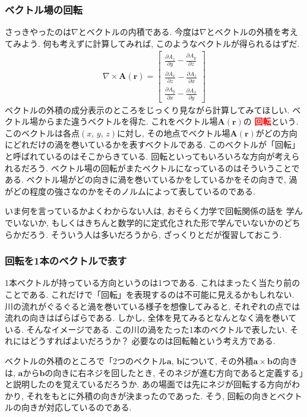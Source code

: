 \subsubsection{ベクトル場の回転}
さっきやったのは$\nabla$とベクトルの内積である. 今度は$\nabla$とベクトルの外積を考えてみよう. 
何も考えずに計算してみれば, このようなベクトルが得られるはずだ. 
\begin{eqnarray}
\nabla \times \bm{A}(\bm{r}) = \left[
\begin{array}{c}
\displaystyle
\frac{\partial A_z}{\partial y} - \frac{\partial A_y}{\partial z} \\
\displaystyle
\frac{\partial A_x}{\partial z} - \frac{\partial A_z}{\partial x} \\
\displaystyle
\frac{\partial A_y}{\partial x} - \frac{\partial A_x}{\partial y} 
\end{array}
\right]
\label{eq:rotnabla}
\end{eqnarray}
ベクトルの外積の成分表示のところをじっくり見ながら計算してみてほしい. 
ベクトル場からまた違うベクトルを得た. これをベクトル場$\bm{A}(\bm{r})$の
\textbf{\textcolor{red}{回転}}という. このベクトルは各点$(x, \, y, \, z)$に対し, 
その地点でベクトル場$\bm{A}(\bm{r})$がどの方向にどれだけの渦を巻いているかを表すベクトルである. 
このベクトルが「回転」と呼ばれているのはそこからきている. 
回転といってもいろいろな方向が考えられるだろう. 
ベクトル場の回転がまたベクトルになっているのはそういうことである. 
ベクトル場がどの向きに渦を巻いているかをしているかをその向きで, 
渦がどの程度の強さなのかをそのノルムによって表しているのである. 

いま何を言っているかよくわからない人は, おそらく力学で回転関係の話を
学んでいないか, もしくはきちんと数学的に定式化された形で学んでいないかのどちらかだろう. 
そういう人は多いだろうから, ざっくりとだが復習しておこう. 
\subsubsection{回転を1本のベクトルで表す}
1本ベクトルが持っている方向というのは1つである. これはまったく当たり前のことである. 
これだけで「回転」を表現するのは不可能に見えるかもしれない. 
川の流れがぐるぐると渦を巻いている様子を想像してみると, それぞれの点では流れの向きはばらばらである. 
しかし, 全体を見てみるとなんとなく渦を巻いている. そんなイメージである. 
この川の渦をたった1本のベクトルで表したい. 
それにはどうすればよいだろうか？ 必要なのは回転軸という考え方である. 

ベクトルの外積のところで「2つのベクトル$\bm{a}$, $\bm{b}$について, 
その外積$\bm{a} \times \bm{b}$の向きは, $\bm{a}$から$\bm{b}$の向きに右ネジを回したとき, 
そのネジが進む方向であると定義する」と説明したのを覚えているだろうか. 
あの場面では先にネジが回転する方向がわかり, それをもとに外積の向きが決まったのであった. 
そう, 回転の向きとベクトルの向きが対応しているのである. 

